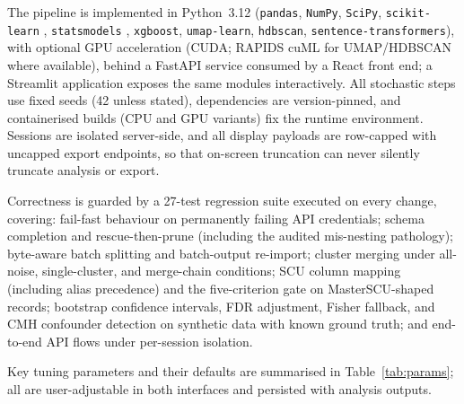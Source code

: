 \documentclass[11pt,a4paper]{article}
\newcommand{\pkg}[1]{\texttt{#1}}
\begin{document}
The pipeline is implemented in Python~3.12 (\pkg{pandas}, \pkg{NumPy}, \pkg{SciPy},
\pkg{scikit-learn} \cite{pedregosa2011}, \pkg{statsmodels} \cite{seabold2010},
\pkg{xgboost}, \pkg{umap-learn}, \pkg{hdbscan}, \pkg{sentence-transformers}), with
optional GPU acceleration (CUDA; RAPIDS cuML for UMAP/HDBSCAN where available), behind
a FastAPI service consumed by a React front end; a Streamlit application exposes the
same modules interactively. All stochastic steps use fixed seeds (42 unless stated),
dependencies are version-pinned, and containerised builds (CPU and GPU variants) fix
the runtime environment. Sessions are isolated server-side, and all display payloads
are row-capped with uncapped export endpoints, so that on-screen truncation can never
silently truncate analysis or export.

Correctness is guarded by a 27-test regression suite executed on every change,
covering: fail-fast behaviour on permanently failing API credentials; schema completion
and rescue-then-prune (including the audited mis-nesting pathology); byte-aware batch
splitting and batch-output re-import; cluster merging under all-noise, single-cluster,
and merge-chain conditions; SCU column mapping (including alias precedence) and the
five-criterion gate on MasterSCU-shaped records; bootstrap confidence intervals,
FDR adjustment, Fisher fallback, and CMH confounder detection on synthetic data with
known ground truth; and end-to-end API flows under per-session isolation.

Key tuning parameters and their defaults are summarised in
Table~\ref{tab:params}; all are user-adjustable in both interfaces and persisted with
analysis outputs.
\end{document}
